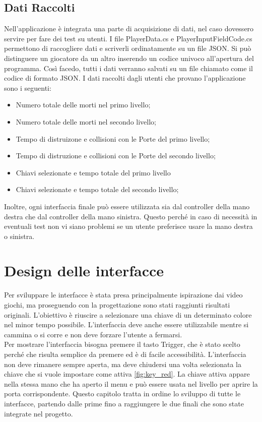 \documentclass[target=bach,aauheader=]{thud}
\begin{document}
\section{Dati Raccolti}
\label{data}
Nell'applicazione è integrata una parte di acquisizione di dati, nel caso dovessero servire per fare dei test su utenti.
I file PlayerData.cs e PlayerInputFieldCode.cs permettono di raccogliere dati e scriverli ordinatamente su un file JSON.
Si può distinguere un giocatore da un altro inserendo un codice univoco all'apertura del programma.
Così facedo, tutti i dati verranno salvati su un file chiamato come il codice di formato JSON.
I dati raccolti dagli utenti che provano l'applicazione sono i seguenti:
\begin{itemize}
    \item Numero totale delle morti nel primo livello;
    \item Numero totale delle morti nel secondo livello;
    \item Tempo di distruizone e collisioni con le Porte del primo livello;
    \item Tempo di distruzione e collisioni con le Porte del secondo livello;
    \item Chiavi selezionate e tempo totale del primo livello
    \item Chiavi selezionate e tempo totale del secondo livello;
\end{itemize}

Inoltre, ogni interfaccia finale può essere utilizzata sia dal controller della mano destra che dal controller della mano sinistra.
Questo perché in caso di necessità in eventuali test non vi siano problemi se un utente preferisce usare la mano destra o sinistra.




\chapter{Design delle interfacce} %
\label{design}
Per sviluppare le interfacce è stata presa principalmente ispirazione dai video giochi, ma proseguendo con la progettazione sono stati raggiunti risultati originali. 
L'obiettivo è riuscire a selezionare una chiave di un determinato colore nel minor tempo possibile.
L'interfaccia deve anche essere utilizzabile mentre si cammina o si corre e non deve forzare l'utente a fermarsi. \\

Per mostrare l'interfaccia bisogna premere il tasto Trigger, che è stato scelto perché che risulta semplice da premere ed è di facile accessibilità.  
L'interfaccia non deve rimanere sempre aperta, ma deve chiudersi una volta selezionata la chiave che si vuole impostare come attiva \ref{fig:key_red}.
La chiave attiva appare nella stessa mano che ha aperto il menu e può essere usata nel livello per aprire la porta corrispondente.
Questo capitolo tratta in ordine lo sviluppo di tutte le interfacce, partendo dalle prime fino a raggiungere le due finali che sono state integrate nel progetto.
\end{document}
